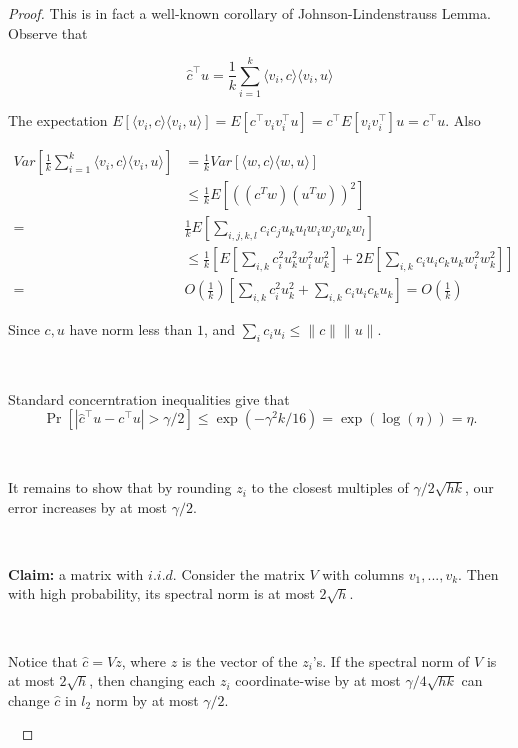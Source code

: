 \begin{proof}
This is in fact a well-known corollary of Johnson-Lindenstrauss Lemma. Observe that 

\begin{equation}
\hat{c}^\top u = \frac{1}{k} \sum_{i=1}^k \langle v_i,c\rangle\langle v_i,u\rangle
\end{equation}


The expectation $E[\langle v_i,c\rangle \langle v_i,u\rangle] = E[c^\top v_iv_i^\top u] = c^\top E[v_iv_i^\top] u = c^\top u$. Also

\begin{align*}
Var[\frac{1}{k} \sum_{i=1}^k \langle v_i,c\rangle\langle v_i,u\rangle]&=\frac{1}{k} Var[\langle w,c\rangle\langle w,u\rangle]\\
&\leq \frac{1}{k}E\left [ ((c^{T} w)(u^{T} w))^{2}\right]\\
=&\frac{1}{k}E\left[\sum_{i,j,k,l} c_{i} c_{j} u_{k} u_{l} w_{i} w_{j}w_{k}w_{l}\right]\\
&\leq \frac{1}{k}\left[E\left[\sum_{i,k} c_{i}^2 u_{k}^2 w_{i}^2 w_{k}^2\right]+2E\left[\sum_{i,k} c_{i}u_{i} c_{k}u_{k} w_{i}^2w_{k}^2\right]\right]\\
=&O\left(\frac{1}{k}\right)\left [\sum_{i,k} c_{i}^2 u_{k}^2+\sum_{i,k} c_{i}u_{i} c_{k}u_{k}\right]=O\left(\frac{1}{k}\right)
\end{align*}

Since $c,u$ have norm less than $1$, and $\sum_{i} c_iu_i \leq \|c\|\|u\|$. 

\ 


Standard concerntration inequalities give that
\begin{equation}
\Pr[|\hat{c}^\top u - c^\top u| > \gamma/2] \le \exp(-\gamma^2k/16)= \exp(\log(\eta))=\eta.
\end{equation}

\ 

It remains to show that by rounding $z_i$ to the closest multiples of $\gamma/2\sqrt{hk}$, our error increases by at most $\gamma/2$. 

\

\textbf{Claim:} a matrix with $i.i.d.$ Consider the matrix $V$ with columns $v_1,...,v_k$. Then with high probability, its spectral norm is at most $2\sqrt{h}$. 

\

Notice that $\hat{c}=Vz$, where $z$ is the vector of the $z_i$'s. If the spectral norm of $V$ is at most $2\sqrt{h}$, then changing each $z_i$ coordinate-wise by at most $\gamma/4\sqrt{hk}$ can change $\hat{c}$ in $l_2$ norm by at most $\gamma/2$.

\ 


\end{proof}

